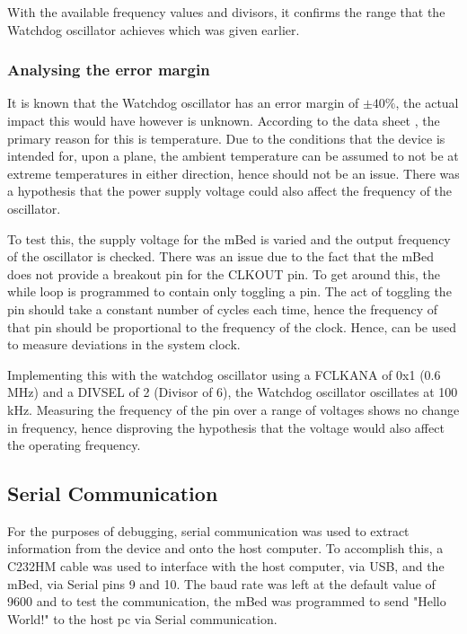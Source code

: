 With the available frequency values and divisors, it confirms the range that the Watchdog oscillator achieves which was given earlier.

\subsubsection{Analysing the error margin}

It is known that the Watchdog oscillator has an error margin of $ \pm 40\%$, the actual impact this would have however is unknown. According to the data sheet \cite{mbed_not_datasheet}, the primary reason for this is temperature. Due to the conditions that the device is intended for, upon a plane, the ambient temperature can be assumed to not be at extreme temperatures in either direction, hence should not be an issue. There was a hypothesis that the power supply voltage could also affect the frequency of the oscillator. 

To test this, the supply voltage for the mBed is varied and the output frequency of the oscillator is checked. There was an issue due to the fact that the mBed does not provide a breakout pin for the CLKOUT pin. To get around this, the while loop is programmed to contain only toggling a pin. The act of toggling the pin should take a constant number of cycles each time, hence the frequency of that pin should be proportional to the frequency of the clock. Hence, can be used to measure deviations in the system clock.

Implementing this with the watchdog oscillator using a FCLKANA of 0x1 (0.6 MHz) and a DIVSEL of 2 (Divisor of 6), the Watchdog oscillator oscillates at 100 kHz. Measuring the frequency of the pin over a range of voltages shows no change in frequency, hence disproving the hypothesis that the voltage would also affect the operating frequency.

\subsection{Serial Communication}

For the purposes of debugging, serial communication was used to extract information from the device and onto the host computer. To accomplish this, a C232HM cable \cite{c232hm_datasheet} was used to interface with the host computer, via USB, and the mBed, via Serial pins 9 and 10. The baud rate was left at the default value of 9600 and to test the communication, the mBed was programmed to send "Hello World!" to the host pc via Serial communication.

